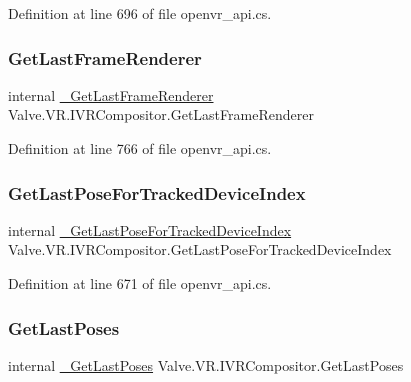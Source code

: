 Definition at line 696 of file openvr\+\_\+api.\+cs.

\mbox{\label{struct_valve_1_1_v_r_1_1_i_v_r_compositor_ad5c9c07736931cc1663a766dfcfa13b0}} 
\subsubsection{\texorpdfstring{GetLastFrameRenderer}{GetLastFrameRenderer}}
{\footnotesize\ttfamily internal \mbox{\hyperlink{struct_valve_1_1_v_r_1_1_i_v_r_compositor_a907be4acb4579b5ee85ba1c6b455f1ea}{\+\_\+\+Get\+Last\+Frame\+Renderer}} Valve.\+V\+R.\+I\+V\+R\+Compositor.\+Get\+Last\+Frame\+Renderer}



Definition at line 766 of file openvr\+\_\+api.\+cs.

\mbox{\label{struct_valve_1_1_v_r_1_1_i_v_r_compositor_a6fbed9f7ac57e65727afe7d867883c12}} 
\subsubsection{\texorpdfstring{GetLastPoseForTrackedDeviceIndex}{GetLastPoseForTrackedDeviceIndex}}
{\footnotesize\ttfamily internal \mbox{\hyperlink{struct_valve_1_1_v_r_1_1_i_v_r_compositor_a707d9c738e4eb3162086a2b14bca3c70}{\+\_\+\+Get\+Last\+Pose\+For\+Tracked\+Device\+Index}} Valve.\+V\+R.\+I\+V\+R\+Compositor.\+Get\+Last\+Pose\+For\+Tracked\+Device\+Index}



Definition at line 671 of file openvr\+\_\+api.\+cs.

\mbox{\label{struct_valve_1_1_v_r_1_1_i_v_r_compositor_a42be7eeaea139f04df7260a6f74791a3}} 
\subsubsection{\texorpdfstring{GetLastPoses}{GetLastPoses}}
{\footnotesize\ttfamily internal \mbox{\hyperlink{struct_valve_1_1_v_r_1_1_i_v_r_compositor_ab8dca04ae79b8aa27b29fb0a87260240}{\+\_\+\+Get\+Last\+Poses}} Valve.\+V\+R.\+I\+V\+R\+Compositor.\+Get\+Last\+Poses}



